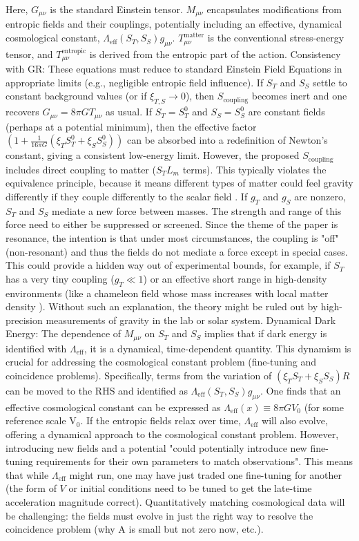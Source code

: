 \documentclass[11pt,a4paper]{article} %
\newcommand{\ST}{S_T}
\newcommand{\SSp}{S_S} %
\newcommand{\Scoupling}{S_{\text{coupling}}}
\newcommand{\Lm}{L_m}
\newcommand{\Tmu}{T} %
\newcommand{\Mmu}{M} %
\newcommand{\Lambdaeff}{\Lambda_{\text{eff}}}
\begin{document}
Here, $G_{\mu\nu}$ is the standard Einstein tensor. $\Mmu_{\mu\nu}$ encapsulates modifications from entropic fields and their couplings, potentially including an effective, dynamical cosmological constant, $\Lambdaeff(\ST,\SSp)g_{\mu\nu}$. $\Tmu^{\text{matter}}_{\mu\nu}$ is the conventional stress-energy tensor, and $\Tmu^{\text{entropic}}_{\mu\nu}$ is derived from the entropic part of the action. Consistency with GR: These equations must reduce to standard Einstein Field Equations in appropriate limits (e.g., negligible entropic field influence). If $\ST$ and $\SSp$ settle to constant background values (or if $\xi_{T,S}\to0$), then $\Scoupling$ becomes inert and one recovers $G_{\mu\nu}=8\pi GT_{\mu\nu}$ as usual. If $\ST=\ST^0$ and $\SSp=\SSp^0$ are constant fields (perhaps at a potential minimum), then the effective factor $(1+\frac{1}{16\pi G}(\xi_T\ST^0+\xi_S\SSp^0))$ can be absorbed into a redefinition of Newton's constant, giving a consistent low-energy limit. However, the proposed $\Scoupling$ includes direct coupling to matter ($\ST\Lm$ terms). This typically violates the equivalence principle, because it means different types of matter could feel gravity differently if they couple differently to the scalar field \cite{Damour2012}. If $g_T$ and $g_S$ are nonzero, $\ST$ and $\SSp$ mediate a new force between masses. The strength and range of this force need to either be suppressed or screened. Since the theme of the paper is resonance, the intention is that under most circumstances, the coupling is "off" (non-resonant) and thus the fields do not mediate a force except in special cases. This could provide a hidden way out of experimental bounds, for example, if $\ST$ has a very tiny coupling ($g_T\ll1$) or an effective short range in high-density environments (like a chameleon field whose mass increases with local matter density \cite{ChameleonTheory,Brax2011}). Without such an explanation, the theory might be ruled out by high-precision measurements of gravity in the lab or solar system. Dynamical Dark Energy: The dependence of $\Mmu_{\mu\nu}$ on $\ST$ and $\SSp$ implies that if dark energy is identified with $\Lambdaeff$, it is a dynamical, time-dependent quantity. This dynamism is crucial for addressing the cosmological constant problem (fine-tuning and coincidence problems). Specifically, terms from the variation of $(\xi_T\ST+\xi_S\SSp)R$ can be moved to the RHS and identified as $\Lambdaeff(\ST,\SSp)g_{\mu\nu}$. One finds that an effective cosmological constant can be expressed as $\Lambdaeff(x)\equiv 8\pi G V_0$ (for some reference scale $\text{V}_0$. If the entropic fields relax over time, $\Lambdaeff$ will also evolve, offering a dynamical approach to the cosmological constant problem. However, introducing new fields and a potential "could potentially introduce new fine-tuning requirements for their own parameters to match observations". This means that while $\Lambdaeff$ might run, one may have just traded one fine-tuning for another (the form of $V$ or initial conditions need to be tuned to get the late-time acceleration magnitude correct). Quantitatively matching cosmological data will be challenging: the fields must evolve in just the right way to resolve the coincidence problem (why A is small but not zero now, etc.).
\end{document}
